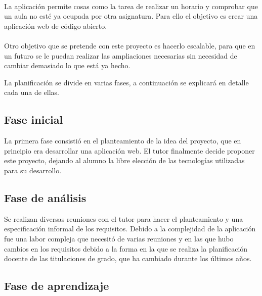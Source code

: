 \documentclass[a4paper,11pt]{article} %
\begin{document}
\paragraph{}
La aplicación permite cosas como la tarea de realizar un horario y comprobar que un aula no esté ya ocupada por otra asignatura. Para ello el objetivo es crear una aplicación web de código abierto.
\paragraph{}
Otro objetivo que se pretende con este proyecto es hacerlo escalable, para que en un futuro se le puedan realizar las ampliaciones necesarias sin necesidad de cambiar demasiado lo que está ya hecho.

La planificación se divide en varias fases, a continuación se explicará en detalle cada una de ellas.

\subsection{Fase inicial}

La primera fase consistió en el planteamiento de la idea del proyecto, que en principio era desarrollar una aplicación web. El tutor finalmente decide proponer este proyecto, dejando al alumno la libre elección de las tecnologías utilizadas para su desarrollo.

\subsection{Fase de análisis}

Se realizan diversas reuniones con el tutor para hacer el planteamiento y una especificación informal de los requisitos. Debido a la complejidad de la aplicación fue una labor compleja que necesitó de varias reuniones y en las que hubo cambios en los requisitos debido a la forma en la que se realiza la planificación docente de las titulaciones de grado, que ha cambiado durante los últimos años.

\subsection{Fase de aprendizaje}
\end{document}
